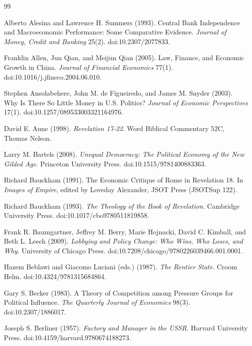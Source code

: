 \documentclass[11pt,letterpaper]{article}
\theoremstyle{definition}
\theoremstyle{remark}
\begin{document}
\begin{thebibliography}{99}
\small
\raggedright

Alberto Alesina and Lawrence H. Summers (1993). Central Bank Independence and Macroeconomic Performance: Some Comparative Evidence. \emph{Journal of Money, Credit and Banking} 25(2). doi:10.2307/2077833.

Franklin Allen, Jun Qian, and Meijun Qian (2005). Law, Finance, and Economic Growth in China. \emph{Journal of Financial Economics} 77(1). doi:10.1016/j.jfineco.2004.06.010.

Stephen Ansolabehere, John M. de Figueiredo, and James M. Snyder (2003). Why Is There So Little Money in U.S. Politics? \emph{Journal of Economic Perspectives} 17(1). doi:10.1257/089533003321164976.

David E. Aune (1998). \emph{Revelation 17-22}. Word Biblical Commentary 52C, Thomas Nelson.

Larry M. Bartels (2008). \emph{Unequal Democracy: The Political Economy of the New Gilded Age}. Princeton University Press. doi:10.1515/9781400883363.

Richard Bauckham (1991). The Economic Critique of Rome in Revelation 18. In \emph{Images of Empire}, edited by Loveday Alexander, JSOT Press (JSOTSup 122).

Richard Bauckham (1993). \emph{The Theology of the Book of Revelation}. Cambridge University Press. doi:10.1017/cbo9780511819858.

Frank R. Baumgartner, Jeffrey M. Berry, Marie Hojnacki, David C. Kimball, and Beth L. Leech (2009). \emph{Lobbying and Policy Change: Who Wins, Who Loses, and Why}. University of Chicago Press. doi:10.7208/chicago/9780226039466.001.0001.

Hazem Beblawi and Giacomo Luciani (eds.) (1987). \emph{The Rentier State}. Croom Helm. doi:10.4324/9781315684864.

Gary S. Becker (1983). A Theory of Competition among Pressure Groups for Political Influence. \emph{The Quarterly Journal of Economics} 98(3). doi:10.2307/1886017.

Joseph S. Berliner (1957). \emph{Factory and Manager in the USSR}. Harvard University Press. doi:10.4159/harvard.9780674188273.


\end{thebibliography}
\end{document}
